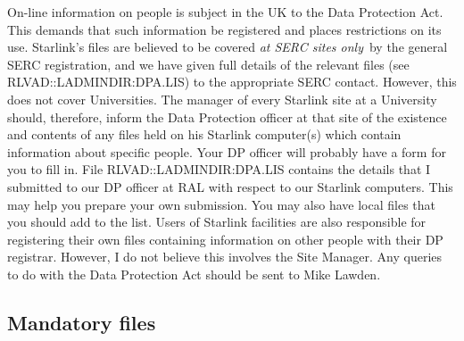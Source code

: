 On-line information on people is subject in the UK to the Data Protection Act.
This demands that such information be registered and places restrictions on its
use.
Starlink's files are believed to be covered {\em at SERC sites only}\, by the
general SERC registration, and we have given full details of the relevant files
(see RLVAD::LADMINDIR:DPA.LIS) to the appropriate SERC contact.
However, this does not cover Universities.
The manager of every Starlink site at a University should, therefore, inform
the Data Protection officer at that site of the existence and contents of any
files held on his Starlink computer(s) which contain information about specific
people.
Your DP officer will probably have a form for you to fill in.
File RLVAD::LADMINDIR:DPA.LIS contains the details that I submitted to our DP
officer at RAL with respect to our Starlink computers.
This may help you prepare your own submission.
You may also have local files that you should add to the list.
Users of Starlink facilities are also responsible for registering their
own files containing information on other people with their DP registrar.
However, I do not believe this involves the Site Manager.
Any queries to do with the Data Protection Act should be sent to Mike Lawden.

\subsection {Mandatory files}

